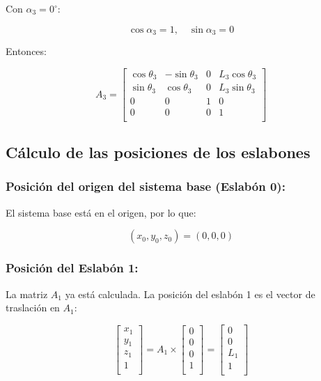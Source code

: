 \documentclass[10pt]{article}
\theoremstyle{definition}
\theoremstyle{remark}
\theoremstyle{definition}
\numberwithin{equation}{prob}
\begin{document}
Con \( \alpha_3 = 0^\circ \):

\[
\cos\alpha_3 = 1, \quad \sin\alpha_3 = 0
\]

Entonces:

\[
A_3 = \begin{bmatrix}
\cos\theta_3 & -\sin\theta_3 & 0 & L_3 \cos\theta_3 \\
\sin\theta_3 & \cos\theta_3 & 0 & L_3 \sin\theta_3 \\
0 & 0 & 1 & 0 \\
0 & 0 & 0 & 1 \\
\end{bmatrix}
\]

\subsection{Cálculo de las posiciones de los eslabones}

\subsubsection{Posición del origen del sistema base (Eslabón 0):}

El sistema base está en el origen, por lo que:

\[
(x_0, y_0, z_0) = (0, 0, 0)
\]

\subsubsection{Posición del Eslabón 1:}

La matriz \( A_1 \) ya está calculada. La posición del eslabón 1 es el vector de traslación en \( A_1 \):

\[
\begin{bmatrix}
x_1 \\
y_1 \\
z_1 \\
1 \\
\end{bmatrix} = A_1 \times \begin{bmatrix}
0 \\
0 \\
0 \\
1 \\
\end{bmatrix} = \begin{bmatrix}
0 \\
0 \\
L_1 \\
1 \\
\end{bmatrix}
\]
\end{document}
